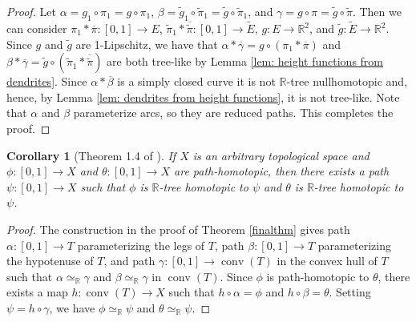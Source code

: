 \documentclass[11pt, leqno]{amsart}
\newtheorem{corollary}[theorem]{Corollary}
\theoremstyle{definition}\newtheorem{definition}[theorem]{Definition}
\newcommand {\conv}{\operatorname{conv}}
\begin{document}
\begin{proof}
Let $\alpha = g_1\circ\pi_1= g\circ\pi_1$, $\beta = \tilde g_1\circ\tilde \pi_1= \tilde g\circ\tilde \pi_1$, and $\gamma = g\circ \pi=\tilde g\circ\tilde  \pi$. Then we can consider $\pi_1*\overline \pi:[0,1]\to E$, $\tilde \pi_1*\overline {\tilde \pi}:[0,1]\to \tilde E$, $g: E\to \mathbb{R}^2$, and  $\tilde g: \tilde E\to \mathbb{R}^2$.  Since $g$ and $\tilde g$ are 1-Lipschitz, we have that $\alpha*\overline\gamma = g\circ (\pi_1*\overline \pi)$ and $\beta*\overline\gamma = \tilde g\circ (\tilde \pi_1*\overline{\tilde  \pi})$ are both tree-like by Lemma  \ref{lem: height functions from dendrites}. Since $\alpha*\overline\beta$ is a simply closed curve it is not $\mathbb R$-tree nullhomotopic and, hence, by Lemma \ref{lem: dendrites from height functions}, it is not tree-like.  Note that $\alpha$ and $\beta$ parameterize arcs, so they are reduced paths.  This completes the proof.







\end{proof}

\begin{corollary}[Theorem 1.4 of \cite{BrazasConnerFabelKent_preprint}]
If $X$ is an arbitrary topological space and $\phi: [0,1]\to X$ and $\theta:[0,1]\to X$ are path-homotopic, then there exists a path $\psi:[0,1]\to X$ such that $\phi$ is $\mathbb R$-tree homotopic to $\psi$ and $\theta$ is $\mathbb R$-tree homotopic to $\psi$.
\end{corollary}


\begin{proof}
The construction in the proof of Theorem \ref{finalthm} gives path $\alpha:[0,1]\to T$ parameterizing the legs of $T$, path $\beta:[0,1]\to T$ parameterizing the hypotenuse of $T$, and path $\gamma:[0,1]\to \conv(T)$ in the convex hull of $T$ such that $\alpha\simeq_{\mathbb{R}}\gamma$ and $\beta\simeq_{\mathbb{R}}\gamma$ in $\conv(T)$. Since $\phi$ is path-homotopic to $\theta$, there exists a map $h:\conv(T)\to X$ such that $h\circ \alpha=\phi$ and $h\circ \beta=\theta$. Setting $\psi=h\circ\gamma$, we have $\phi\simeq_{\mathbb{R}}\psi$ and $\theta\simeq_{\mathbb{R}}\psi$.
\end{proof}


	
	
\end{document}

